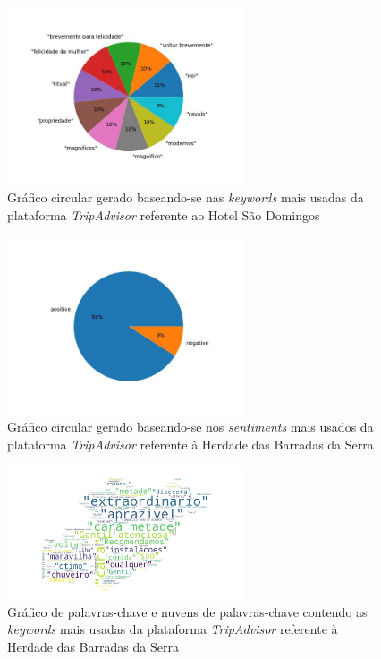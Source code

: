 \begin{figure}[!htb]
\centering
\includegraphics[width=7cm]{figuras/TripAdvisor/Hotels/hotel8_keywords.jpeg}
\caption{Gráfico circular gerado baseando-se nas \textit{keywords} mais usadas da plataforma \textit{TripAdvisor} referente ao Hotel São Domingos}
\label{fig:exemplofig}
\end{figure}

\begin{figure}[!htb]
\centering
\includegraphics[width=7cm]{figuras/TripAdvisor/Hotels/hotel21_sentiments.jpeg}
\caption{Gráfico circular gerado baseando-se nos \textit{sentiments} mais usados da plataforma \textit{TripAdvisor} referente à Herdade das Barradas da Serra}
\label{fig:exemplofig}
\end{figure}

\begin{figure}[!htb]
\centering
\includegraphics[width=7cm]{figuras/TripAdvisor/Hotels/hotel21_keywordcloud.jpeg}
\caption{Gráfico de palavras-chave e nuvens de palavras-chave contendo as \textit{keywords} mais usadas da plataforma \textit{TripAdvisor} referente à Herdade das Barradas da Serra}
\label{fig:exemplofig}
\end{figure}

